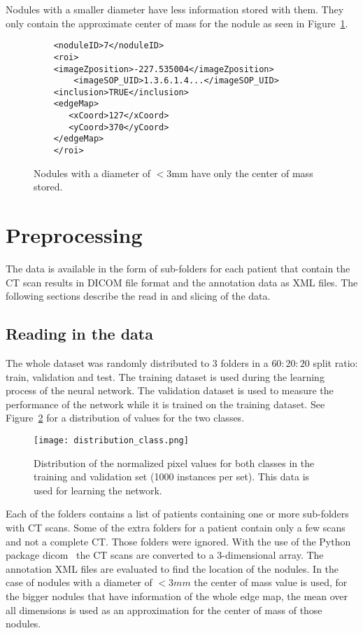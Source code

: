 \documentclass[../Thesis.tex]{subfiles}
\begin{document}
Nodules with a smaller diameter have less information stored with them. They only contain the approximate center of mass for the nodule as seen in Figure~\ref{fig:smallNod}.

\begin{figure}
\begin{lstlisting}
	<noduleID>7</noduleID>
	<roi>
	<imageZposition>-227.535004</imageZposition>
        <imageSOP_UID>1.3.6.1.4...</imageSOP_UID>
	<inclusion>TRUE</inclusion>
	<edgeMap>
	   <xCoord>127</xCoord>
	   <yCoord>370</yCoord>
	</edgeMap>
	</roi>
\end{lstlisting}
\caption{Nodules with a diameter of $<3$mm have only the center of mass stored.}
\label{fig:smallNod}
\end{figure}

\section{Preprocessing}
The data is available in the form of sub-folders for each patient that contain the CT scan results in DICOM file format and the annotation data as XML files. The following sections describe the read in and slicing of the data.

\subsection{Reading in the data}
The whole dataset was randomly distributed to 3 folders in a $60:20:20$ split ratio: train, validation and test. The training dataset is used during the learning process of the neural network. The validation dataset is used to measure the performance of the network while it is trained on the training dataset. See Figure~\ref{fig:ttdist} for a distribution of values for the two classes.
 
\begin{figure}
\texttt{[image: distribution\_class.png]}
\caption{Distribution of the normalized pixel values for both classes in the training and validation set (1000 instances per set). This data is used for learning the network.}
\label{fig:ttdist}
\end{figure}

Each of the folders contains a list of patients containing one or more sub-folders with CT scans. Some of the extra folders for a patient contain only a few scans and not a complete CT. Those folders were ignored. With the use of the Python package dicom~\cite{mason2011t} the CT scans are converted to a 3-dimensional array. The annotation XML files are evaluated to find the location of the nodules. In the case of nodules with a diameter of $<3mm$ the center of mass value is used, for the bigger nodules that have information of the whole edge map, the mean over all dimensions is used as an approximation for the center of mass of those nodules. 
\end{document}
